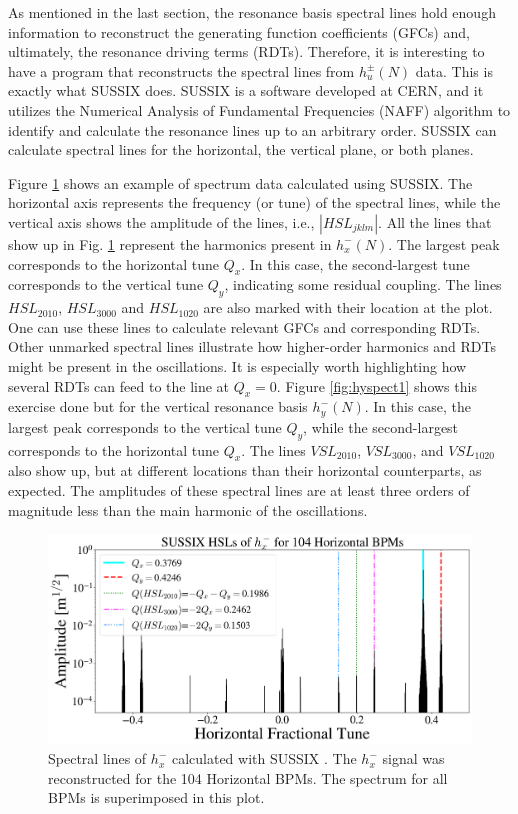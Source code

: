 As mentioned in the last section, the resonance basis spectral lines hold enough information to reconstruct the generating function coefficients (GFCs) and, ultimately, the resonance driving terms (RDTs). Therefore, it is interesting to have a program that reconstructs the spectral lines from $h_u^{\pm}(N)$ data. This is exactly what SUSSIX \cite{sussix} does. SUSSIX is a software developed at CERN, and it utilizes the Numerical Analysis of Fundamental Frequencies (NAFF) algorithm to identify and calculate the resonance lines up to an arbitrary order. SUSSIX can calculate spectral lines for the horizontal, the vertical plane, or both planes.   

Figure \ref{fig:hxspect1} shows an example of spectrum data calculated using SUSSIX. The horizontal axis represents the frequency (or tune) of the spectral lines, while the vertical axis shows the amplitude of the lines, i.e., $|HSL_{jklm}|$. All the lines that show up in Fig. \ref{fig:hxspect1} represent the harmonics present in $h_x^{-}(N)$. The largest peak corresponds to the horizontal tune $Q_x$. In this case, the second-largest tune corresponds to the vertical tune $Q_y$, indicating some residual coupling. The lines $HSL_{2010}$, $HSL_{3000}$ and $HSL_{1020}$ are also marked with their location at the plot. One can use these lines to calculate relevant GFCs and corresponding RDTs. Other unmarked spectral lines illustrate how higher-order harmonics and RDTs might be present in the oscillations. It is especially worth highlighting how several RDTs can feed to the line at $Q_x=0$. Figure \ref{fig:hyspect1} shows this exercise done but for the vertical resonance basis $h_y^{-}(N)$. In this case, the largest peak corresponds to the vertical tune $Q_y$, while the second-largest corresponds to the horizontal tune $Q_x$. The lines $VSL_{2010}$, $VSL_{3000}$, and $VSL_{1020}$ also show up, but at different locations than their horizontal counterparts, as expected. The amplitudes of these spectral lines are at least three orders of magnitude less than the main harmonic of the oscillations.  

\begin{figure}[H]
    \centering
    \includegraphics[width=\columnwidth]{chapter4/hxspect.png}
    \caption{Spectral lines of $h_x^{-}$ calculated with SUSSIX \cite{sussix}. The $h_x^{-}$ signal was reconstructed for the 104 Horizontal BPMs. The spectrum for all BPMs is superimposed in this plot.}
    \label{fig:hxspect1}
\end{figure}

